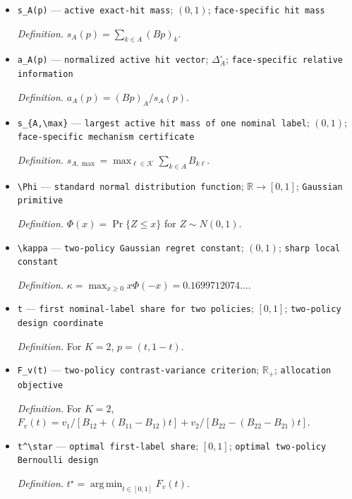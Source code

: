 \documentclass{article}
\begin{document}
\begin{itemize}
  \item \texttt{s\_\allowbreak{}A(p)} --- \texttt{active exact-\allowbreak{}hit mass}; \((0,1)\); \texttt{face-\allowbreak{}specific hit mass}
  \par\smallskip\noindent\emph{Definition.} \(s_A(p)=\sum_{k\in A}(Bp)_k\).
  \item \texttt{a\_\allowbreak{}A(p)} --- \texttt{normalized active hit vector}; \(\Delta_A^\circ\); \texttt{face-\allowbreak{}specific relative information}
  \par\smallskip\noindent\emph{Definition.} \(a_A(p)=(Bp)_A/s_A(p)\).
  \item \texttt{s\_\allowbreak{}\{A,\allowbreak{}\textbackslash{}\allowbreak{}max\}\allowbreak{}} --- \texttt{largest active hit mass of one nominal label}; \((0,1)\); \texttt{face-\allowbreak{}specific mechanism certificate}
  \par\smallskip\noindent\emph{Definition.} \(s_{A,\max}=\max_{\ell\in\mathcal K}\sum_{k\in A}B_{k\ell}\).
  \item \texttt{\textbackslash{}\allowbreak{}Phi} --- \texttt{standard normal distribution function}; \(\mathbb R\to[0,1]\); \texttt{Gaussian primitive}
  \par\smallskip\noindent\emph{Definition.} \(\Phi(x)=\Pr\{Z\leq x\}\) for \(Z\sim N(0,1)\).
  \item \texttt{\textbackslash{}\allowbreak{}kappa} --- \texttt{two-\allowbreak{}policy Gaussian regret constant}; \((0,1)\); \texttt{sharp local constant}
  \par\smallskip\noindent\emph{Definition.} \(\kappa=\max_{x\geq0}x\Phi(-x)=0.1699712074\ldots\).
  \item \texttt{t} --- \texttt{first nominal-\allowbreak{}label share for two policies}; \([0,1]\); \texttt{two-\allowbreak{}policy design coordinate}
  \par\smallskip\noindent\emph{Definition.} For \(K=2\), \(p=(t,1-t)\).
  \item \texttt{F\_\allowbreak{}v(t)} --- \texttt{two-\allowbreak{}policy contrast-\allowbreak{}variance criterion}; \(\mathbb R_+\); \texttt{allocation objective}
  \par\smallskip\noindent\emph{Definition.} For \(K=2\), \(F_v(t)=v_1/[B_{12}+(B_{11}-B_{12})t]+v_2/[B_{22}-(B_{22}-B_{21})t]\).
  \item \texttt{t\textasciicircum{}\textbackslash{}\allowbreak{}star} --- \texttt{optimal first-\allowbreak{}label share}; \([0,1]\); \texttt{optimal two-\allowbreak{}policy Bernoulli design}
  \par\smallskip\noindent\emph{Definition.} \(t^\star=\operatorname*{arg\,min}_{t\in[0,1]}F_v(t)\).

\end{itemize}
\end{document}

